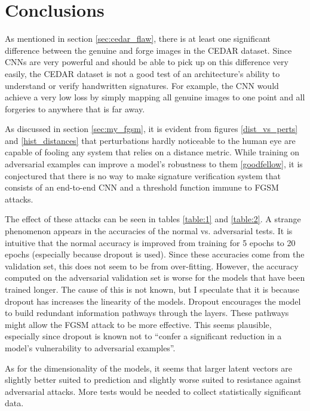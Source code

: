 \section{Conclusions}\label{sec:conclusion}

As mentioned in section \ref{sec:cedar_flaw}, there is at least one significant difference between the genuine and forge images in the CEDAR dataset.
Since CNNs are very powerful and should be able to pick up on this difference very easily, the CEDAR dataset is not a good test of an architecture's ability to understand or verify handwritten signatures.
For example, the CNN would achieve a very low loss by simply mapping all genuine images to one point and all forgeries to anywhere that is far away.

As discussed in section \ref{sec:my_fgsm}, it is evident from figures \ref{dist_vs_perts} and \ref{hist_distances} that perturbations hardly noticeable to the human eye are capable of fooling any system that relies on a distance metric.
While training on adversarial examples can improve a model's robustness to them \ref{goodfellow}, it is conjectured that there is no way to make signature verification system that consists of an end-to-end CNN and a threshold function immune to FGSM attacks.

The effect of these attacks can be seen in tables \ref{table:1} and \ref{table:2}.
A strange phenomenon appears in the accuracies of the normal vs. adversarial tests.
It is intuitive that the normal accuracy is improved from training for 5 epochs to 20 epochs (especially because dropout is used).
Since these accuracies come from the validation set, this does not seem to be from over-fitting.
However, the accuracy computed on the adversarial validation set is worse for the models that have been trained longer.
The cause of this is not known, but I speculate that it is because dropout has increases the linearity of the models.
Dropout encourages the model to build redundant information pathways through the layers.
These pathways might allow the FGSM attack to be more effective.
This seems plausible, especially since dropout is known not to ``confer a significant reduction in a model's vulnerability to adversarial examples''\cite{goodfellow}.

As for the dimensionality of the models, it seems that larger latent vectors are slightly better suited to prediction and slightly worse suited to resistance against adversarial attacks.
More tests would be needed to collect statistically significant data.

